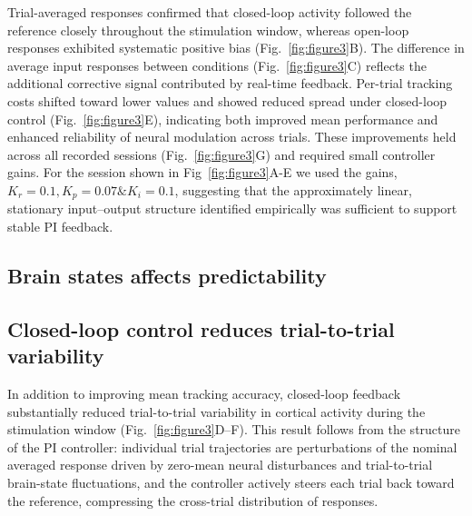 Trial-averaged responses confirmed that closed-loop activity followed the reference closely throughout the stimulation window, whereas open-loop responses exhibited systematic positive bias (Fig.~\ref{fig:figure3}B).
The difference in average input responses between conditions (Fig.~\ref{fig:figure3}C) reflects the additional corrective signal contributed by real-time feedback. 
Per-trial tracking costs shifted toward lower values and showed reduced spread under closed-loop control (Fig.~\ref{fig:figure3}E), indicating both improved mean performance and enhanced reliability of neural modulation across trials. 
These improvements held across all recorded sessions (Fig.~\ref{fig:figure3}G) and required small controller gains. For the session shown in Fig~\ref{fig:figure3}A-E we used the gains, $K_{r} = \mathbf{0.1}, K_{p} = \mathbf{0.07} \& K_{i} = \mathbf{0.1}$, suggesting that the approximately linear, stationary input--output structure identified empirically was sufficient to support stable PI feedback.

\subsection*{Brain states affects predictability}


\subsection*{Closed-loop control reduces trial-to-trial variability}
In addition to improving mean tracking accuracy, closed-loop feedback substantially reduced trial-to-trial variability in cortical activity during the stimulation window (Fig.~\ref{fig:figure3}D--F). 
This result follows from the structure of the PI controller: individual trial trajectories are perturbations of the nominal averaged response driven by zero-mean neural disturbances and trial-to-trial brain-state fluctuations, and the controller actively steers each trial back toward the reference, compressing the cross-trial distribution of responses.

